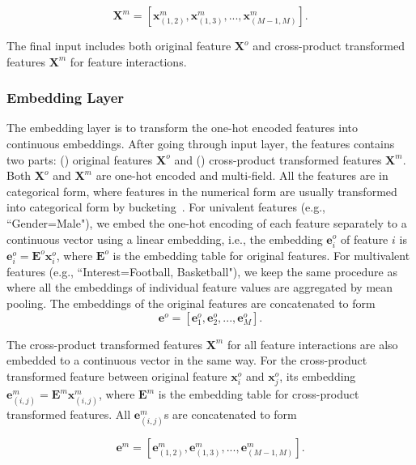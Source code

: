 \documentclass[conference]{IEEEtran}
\begin{document}
\begin{equation}
    \mathbf{X}^{m} = [\mathbf{x}^{m}_{(1,2)}, \mathbf{x}^{m}_{(1,3)}, ..., \mathbf{x}^{m}_{(M-1,M)}].
\end{equation}

The final input includes both original feature $\mathbf{X}^{o}$ and cross-product transformed features $\mathbf{X}^{m}$ for feature interactions.


\subsubsection{Embedding Layer}
\label{embedding}

The embedding layer is to transform the one-hot encoded features into continuous embeddings. After going through input layer, the features contains two parts: () original features $\mathbf{X}^{o}$ and () cross-product transformed features $\mathbf{X}^{m}$. Both $\mathbf{X}^{o}$ and $\mathbf{X}^{m}$ are one-hot encoded and multi-field. All the features are in categorical form, where features in the numerical form are usually transformed into categorical form by bucketing~\cite{DeepFM,PNN16}.
For univalent features (e.g., ``Gender=Male"), we embed the one-hot encoding of each feature separately to a continuous vector using a linear embedding, i.e., the embedding $\mathbf{e}^{o}_i$ of feature $i$ is $\mathbf{e}^{o}_i = \mathbf{E}^{o} \mathbf{x}^{o}_i$, where $\mathbf{E}^{o}$ is the embedding table for original features. For multivalent features (e.g., ``Interest=Football, Basketball"), we keep the same procedure as \cite{PNN16,PNN19,DeepFM} where all the embeddings of individual feature values are aggregated by mean pooling. The embeddings of the original features are concatenated to form
\begin{equation}
    \mathbf{e}^{o} = [\mathbf{e}^{o}_1, \mathbf{e}^{o}_2, ..., \mathbf{e}^{o}_M].
\end{equation}

The cross-product transformed features $\mathbf{X}^{m}$ for all feature interactions are also embedded to a continuous vector in the same way. For the cross-product transformed feature between original feature $\mathbf{x}^o_i$ and $\mathbf{x}^o_j$, its embedding $\mathbf{e}^{m}_{(i,j)} = \mathbf{E}^{m} \mathbf{x}^{m}_{(i,j)}$, where $\mathbf{E}^{m}$ is the embedding table for cross-product transformed features. All $\mathbf{e}^{m}_{(i,j)}$s are concatenated to form

\begin{equation}
    \mathbf{e}^{m} = [\mathbf{e}^{m}_{(1,2)}, \mathbf{e}^{m}_{(1,3)}, ..., \mathbf{e}^{m}_{(M-1,M)}].
\end{equation}
\end{document}

